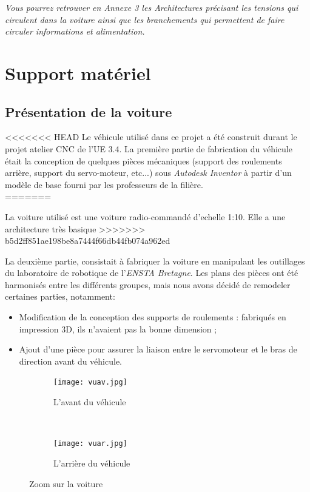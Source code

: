\documentclass[12pt, openany]{report}
\begin{document}
\textit{Vous pourrez retrouver en Annexe 3 les Architectures précisant les tensions qui circulent dans la voiture ainsi que les branchements qui permettent de faire circuler informations et alimentation.}\\

\section{Support matériel}
\subsection{Présentation de la voiture}
<<<<<<< HEAD
Le véhicule utilisé dans ce projet a été construit durant le projet atelier \textsc{CNC} de l’UE 3.4. La première partie de fabrication du véhicule était la conception de quelques pièces mécaniques (support des roulements arrière, support du servo-moteur, etc...) sous \textit{Autodesk Inventor} à partir d'un modèle de base fourni par les professeurs de la filière.\\
=======

La voiture utilisé est une voiture radio-commandé d'echelle 1:10. Elle a une architecture très basique
>>>>>>> b5d2ff851ae198be8a7444f66db44fb074a962ed

La deuxième partie, consistait à fabriquer la voiture en manipulant les outillages du laboratoire de robotique de l'\textit{ENSTA Bretagne}. Les plans des pièces ont été harmonisés entre les différents groupes, mais nous avons décidé de remodeler certaines parties, notamment:

\begin{itemize}[label=\textbullet, font=\small]
    \item Modification de la conception des supports de roulements : fabriqués en impression \textsc{3D}, ils n'avaient pas la bonne dimension ;
    \item Ajout d'une pièce pour assurer la liaison entre le servomoteur et le bras de direction avant du véhicule.\\
\end{itemize}

\begin{figure}[H]
     \centering
     \begin{subfigure}[b]{0.45\textwidth}
         \centering
         \texttt{[image: vuav.jpg]}
         \caption{L'avant du véhicule}
     \end{subfigure}
     ~
     \begin{subfigure}[b]{0.45\textwidth}
         \centering
         \texttt{[image: vuar.jpg]}
         \caption{L'arrière du véhicule}
     \end{subfigure}
     \caption{Zoom sur la voiture}
\end{figure}
\end{document}
